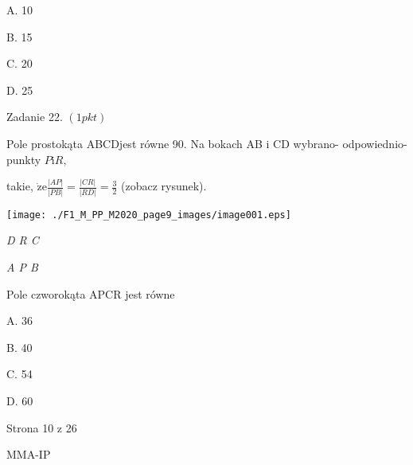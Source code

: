 \documentclass[a4paper,12pt]{article}
\begin{document}
A. 10

B. 15

C. 20

D. 25

Zadanie 22. $(1pkt)$

Pole prostokąta ABCDjest równe 90. Na bokach AB $\mathrm{i}$ CD wybrano- odpowiednio- punkty $P\mathrm{i}R,$

takie, $\displaystyle \dot{\mathrm{z}}\mathrm{e}\frac{|AP|}{|PB|}=\frac{|CR|}{|RD|}=\frac{3}{2}$ (zobacz rysunek).
\begin{center}
\texttt{[image: ./F1\_M\_PP\_M2020\_page9\_images/image001.eps]}
\end{center}
{\it D R  C}

{\it A  P B}

Pole czworokąta APCR jest równe

A. 36

B. 40

C. 54

D. 60

Strona 10 z 26

MMA-IP
\end{document}
